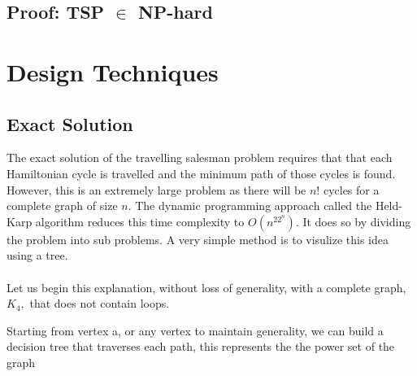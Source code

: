 \documentclass[11pt]{article}
\begin{document}
\subsection{Proof: TSP $\in$ NP-hard}
\section{Design Techniques}
	\subsection{Exact Solution}
	The exact solution of the travelling salesman problem requires that that each Hamiltonian cycle is travelled and the minimum path of those cycles is found. However, this is an extremely large problem as there will be $n!$ cycles for a complete graph of size $n$. The dynamic programming approach called the Held-Karp algorithm reduces this time complexity to $O(n^22^n)$. It does so by dividing the problem into sub problems.  A very simple method is to visulize this idea using a tree. \paragraph{}
	Let us begin this explanation, without loss of generality, with a complete graph, $K_4,$ that does not contain loops. 
\begin{center}
\end{center}
Starting from vertex a, or any vertex to maintain generality, we can build a decision tree that traverses each path, this represents the the power set of the graph
\end{document}
